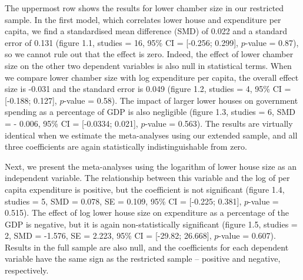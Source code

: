 \documentclass[11pt,a4paper,]{article}
\begin{document}
The uppermost row shows the results for lower chamber size in our
restricted sample. In the first model, which correlates lower house and
expenditure per capita, we find a standardised mean difference (SMD) of
0.022 and a standard error of 0.131 (figure 1.1, studies = 16, 95\% CI =
{[}-0.256; 0.299{]}, \(p\)-value = 0.87), so we cannot rule out that the
effect is zero. Indeed, the effect of lower chamber size on the other
two dependent variables is also null in statistical terms. When we
compare lower chamber size with log expenditure per capita, the overall
effect size is -0.031 and the standard error is 0.049 (figure 1.2,
studies = 4, 95\% CI = {[}-0.188; 0.127{]}, \(p\)-value = 0.58). The
impact of larger lower houses on government spending as a percentage of
GDP is also negligible (figure 1.3, studies = 6, SMD = - 0.006, 95\% CI
= {[}-0.0334; 0.021{]}, \(p\)-value = 0.563). The results are virtually
identical when we estimate the meta-analyses using our extended sample,
and all three coefficients are again statistically indistinguishable
from zero.

Next, we present the meta-analyses using the logarithm of lower house
size as an independent variable. The relationship between this variable
and the log of per capita expenditure is positive, but the coefficient
is not significant (figure 1.4, studies = 5, SMD = 0.078, SE = 0.109,
95\% CI = {[}-0.225; 0.381{]}, \(p\)-value = 0.515). The effect of log
lower house size on expenditure as a percentage of the GDP is negative,
but it is again non-statistically significant (figure 1.5, studies = 2,
SMD = -1.576, SE = 2.223, 95\% CI = {[}-29.82; 26.668{]}, \(p\)-value =
0.607). Results in the full sample are also null, and the coefficients
for each dependent variable have the same sign as the restricted sample
-- positive and negative, respectively.
\end{document}
